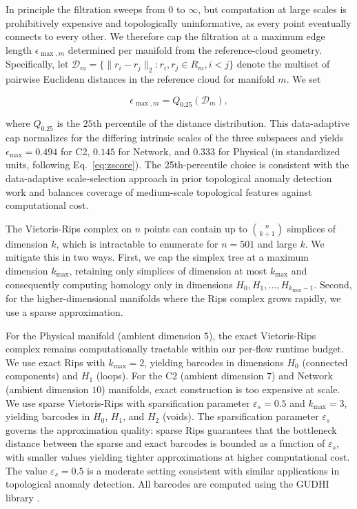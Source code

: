 \documentclass[conf]{new-aiaa}
\begin{document}
In principle the filtration sweeps from $0$ to $\infty$, but computation at large scales is prohibitively expensive and topologically uninformative, as every point eventually connects to every other. We therefore cap the filtration at a maximum edge length $\epsilon_{\max,m}$ determined per manifold from the reference-cloud geometry. Specifically, let $\mathcal{D}_m = \{ \|r_i - r_j\|_2 : r_i, r_j \in R_m, i < j \}$ denote the multiset of pairwise Euclidean distances in the reference cloud for manifold $m$. We set

\begin{equation}
\epsilon_{\max,m} = Q_{0.25}(\mathcal{D}_m),
\label{eq:filtration_cap}
\end{equation}

where $Q_{0.25}$ is the $25$th percentile of the distance distribution. This data-adaptive cap normalizes for the differing intrinsic scales of the three subspaces and yields $\epsilon_{\max} = 0.494$ for C2, $0.145$ for Network, and $0.333$ for Physical (in standardized units, following Eq.~\eqref{eq:zscore}). The 25th-percentile choice is consistent with the data-adaptive scale-selection approach in prior topological anomaly detection work \cite{Bruillard} and balances coverage of medium-scale topological features against computational cost.

The Vietoris-Rips complex on $n$ points can contain up to $\binom{n}{k+1}$ simplices of dimension $k$, which is intractable to enumerate for $n = 501$ and large $k$. We mitigate this in two ways. First, we cap the simplex tree \cite{BoissonnatMaria} at a maximum dimension $k_{\max}$, retaining only simplices of dimension at most $k_{\max}$ and consequently computing homology only in dimensions $H_0, H_1, \ldots, H_{k_{\max}-1}$. Second, for the higher-dimensional manifolds where the Rips complex grows rapidly, we use a sparse approximation.

For the Physical manifold (ambient dimension $5$), the exact Vietoris-Rips complex remains computationally tractable within our per-flow runtime budget. We use exact Rips with $k_{\max} = 2$, yielding barcodes in dimensions $H_0$ (connected components) and $H_1$ (loops). For the C2 (ambient dimension $7$) and Network (ambient dimension $10$) manifolds, exact construction is too expensive at scale. We use sparse Vietoris-Rips \cite{Cavanna} with sparsification parameter $\varepsilon_s = 0.5$ and $k_{\max} = 3$, yielding barcodes in $H_0$, $H_1$, and $H_2$ (voids). The sparsification parameter $\varepsilon_s$ governs the approximation quality: sparse Rips guarantees that the bottleneck distance between the sparse and exact barcodes is bounded as a function of $\varepsilon_s$, with smaller values yielding tighter approximations at higher computational cost. The value $\varepsilon_s = 0.5$ is a moderate setting consistent with similar applications in topological anomaly detection. All barcodes are computed using the GUDHI library \cite{Maria}.
\end{document}
